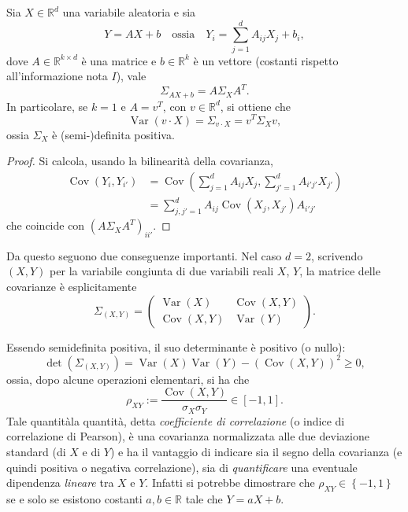 \documentclass[
  italian,
  letterpaper,
]{book}
\newcommand{\bra}[1]{\left( #1 \right)}
\newcommand{\cur}[1]{\left\{ #1 \right\}}
\newcommand{\R}{\mathbb{R}}
\newcommand{\Var}[1]{\operatorname{Var}\bra{#1}}
\newcommand{\Cov}[1]{\operatorname{Cov}\bra{#1}}
\theoremstyle{definition}
\theoremstyle{remark}
\begin{document}
Sia \(X \in \R^d\) una variabile aleatoria e sia
\[ Y = AX+b \quad \text{ossia} \quad Y_i = \sum_{j=1}^d A_{ij} X_j + b_i,\]
dove \(A \in \R^{k \times d}\) è una matrice e \(b \in \R^k\) è un
vettore (costanti rispetto all'informazione nota \(I\)), vale
\[ \Sigma_{AX+b} = A \Sigma_X A^T.\] In particolare, se \(k=1\) e
\(A = v^T\), con \(v \in \R^{d}\), si ottiene che
\[  \Var{v \cdot X}= \Sigma_{v\cdot X} = v^T \Sigma_X v,\] ossia
\(\Sigma_X\) è (semi-)definita positiva.

\begin{proof}
Si calcola, usando la bilinearità della covarianza,
\[  \begin{split} \Cov{Y_i, Y_{i'} } & =  \Cov{  \sum_{j=1}^d A_{ij} X_j,   \sum_{j'=1}^d A_{i'j'} X_{j'}}\\
&  = \sum_{j,j' = 1}^d A_{ij}\Cov{X_j, X_{j'}} A_{i' j'}
\end{split}\] che coincide con \((A \Sigma_X A^T)_{ii'}\).
\end{proof}

Da questo seguono due conseguenze importanti. Nel caso \(d=2\),
scrivendo \((X,Y)\) per la variabile congiunta di due variabili reali
\(X\), \(Y\), la matrice delle covarianze è esplicitamente
\[ \Sigma_{(X,Y)} = \bra{ \begin{array}{cc}\Var{X} & \Cov{X,Y}\\ 
\Cov{X,Y} & \Var{Y} \end{array}}.\]

Essendo semidefinita positiva, il suo determinante è positivo (o nullo):
\[\det(\Sigma_{(X,Y)}) = \Var{X}\Var{Y} - (\Cov{X,Y})^2 \ge 0,\] ossia,
dopo alcune operazioni elementari, si ha che
\[ \rho_{XY} := \frac{ \Cov{X,Y}}{\sigma_X \sigma_Y} \in [-1,1].\] Tale
quantitàla quantità, detta \emph{coefficiente di correlazione} (o indice
di correlazione di Pearson), è una covarianza normalizzata alle due
deviazione standard (di \(X\) e di \(Y\)) e ha il vantaggio di indicare
sia il segno della covarianza (e quindi positiva o negativa
correlazione), sia di \emph{quantificare} una eventuale dipendenza
\emph{lineare} tra \(X\) e \(Y\). Infatti si potrebbe dimostrare che
\(\rho_{XY} \in \cur{-1,1}\) se e solo se esistono costanti
\(a, b \in \R\) tale che \(Y = aX+b\).
\end{document}

